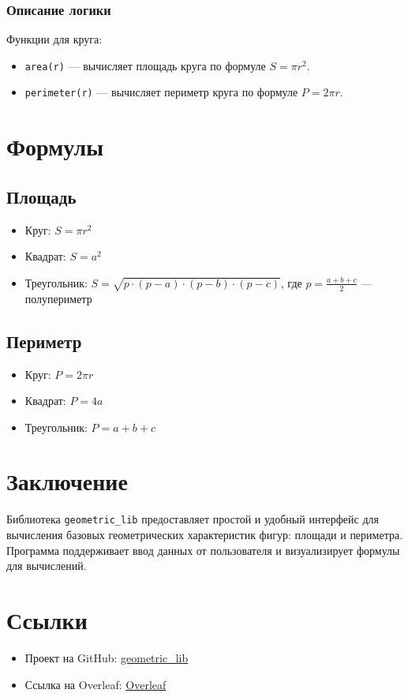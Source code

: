 \documentclass[a4paper,12pt]{article}
\begin{document}
\subsubsection{Описание логики}
Функции для круга:
\begin{itemize}
    \item \texttt{area(r)} — вычисляет площадь круга по формуле $S = \pi r^2$.
    \item \texttt{perimeter(r)} — вычисляет периметр круга по формуле $P = 2 \pi r$.
\end{itemize}

\section{Формулы}

\subsection{Площадь}
\begin{itemize}
    \item Круг: $S = \pi r^2$
    \item Квадрат: $S = a^2$
    \item Треугольник: $S = \sqrt{p \cdot (p - a) \cdot (p - b) \cdot (p - c)}$, где $p = \frac{a + b + c}{2}$ — полупериметр
\end{itemize}

\subsection{Периметр}
\begin{itemize}
    \item Круг: $P = 2 \pi r$
    \item Квадрат: $P = 4a$
    \item Треугольник: $P = a + b + c$
\end{itemize}

\section{Заключение}
Библиотека \texttt{geometric\_lib} предоставляет простой и удобный интерфейс для вычисления базовых геометрических характеристик фигур: площади и периметра. Программа поддерживает ввод данных от пользователя и визуализирует формулы для вычислений.

\section{Ссылки}
\begin{itemize}
    \item Проект на GitHub: \href{https://github.com/Cpp-Gleb/geometric_lib/}{geometric\_lib}
    \item Ссылка на Overleaf: \href{https://ru.overleaf.com/read/nfdxcjbzttsg#0f783f}{Overleaf}
\end{itemize}
\end{document}
